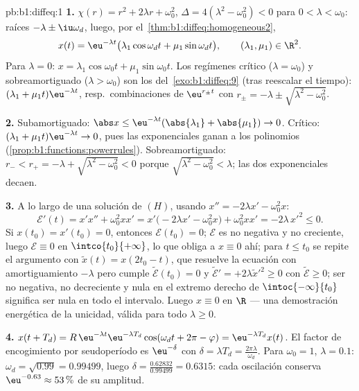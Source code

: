 \begin{solution}{pb:b1:diffeq:1}
\textbf{1.} $\chi(r) = r^2 + 2\lambda r + \omega_0^2$,
$\Delta = 4(\lambda^2 - \omega_0^2) < 0$ para $0 < \lambda < \omega_0$:
raíces $-\lambda \pm \iu\omega_d$, luego, por
el~\cref{thm:b1:diffeq:homogeneous2},
\[
x(t) = \eu^{-\lambda t}\bigl(\lambda_1\cos\omega_d t +
\mu_1\sin\omega_d t\bigr), \qquad (\lambda_1, \mu_1) \in \R^2 .
\]
Para $\lambda = 0$: $x = \lambda_1\cos\omega_0 t + \mu_1\sin\omega_0 t$.
Los regímenes crítico ($\lambda = \omega_0$) y sobreamortiguado
($\lambda > \omega_0$) son los del~\cref{exo:b1:diffeq:9} (tras
reescalar el tiempo): $(\lambda_1 + \mu_1 t)\eu^{-\lambda t}$, resp.\
combinaciones de $\eu^{r_\pm t}$ con
$r_\pm = -\lambda \pm \sqrt{\lambda^2 - \omega_0^2}$.

\textbf{2.} Subamortiguado: $\abs x \leq \eu^{-\lambda
t}(\abs{\lambda_1} + \abs{\mu_1}) \to 0$. Crítico:
$(\lambda_1 + \mu_1 t)\eu^{-\lambda t} \to 0$, pues las exponenciales
ganan a los polinomios (\cref{prop:b1:functions:powerrules}).
Sobreamortiguado: $r_- < r_+ = -\lambda + \sqrt{\lambda^2 -
\omega_0^2} < 0$ porque $\sqrt{\lambda^2 - \omega_0^2} < \lambda$; las
dos exponenciales decaen.

\textbf{3.} A lo largo de una solución de $(H)$, usando
$x'' = -2\lambda x' - \omega_0^2 x$:
\[
\mathcal E'(t) = x'x'' + \omega_0^2 x x'
= x'\bigl(-2\lambda x' - \omega_0^2 x\bigr) + \omega_0^2 xx'
= -2\lambda\,x'^2 \leq 0 .
\]
Si $x(t_0) = x'(t_0) = 0$, entonces $\mathcal E(t_0) = 0$; $\mathcal E$
es no negativa y no creciente, luego $\mathcal E \equiv 0$ en
$\intco{t_0}{+\infty}$, lo que obliga a $x \equiv 0$ ahí; para
$t \leq t_0$ se repite el argumento con $\tilde x(t) = x(2t_0 - t)$,
que resuelve la ecuación con amortiguamiento $-\lambda$ pero cumple
$\tilde{\mathcal E}(t_0) = 0$ y $\tilde{\mathcal E}' =
+2\lambda\tilde x'^2 \geq 0$ con $\tilde{\mathcal E} \geq 0$; ser no
negativa, no decreciente y nula en el extremo derecho de
$\intoc{-\infty}{t_0}$ significa ser nula en todo el intervalo. Luego
$x \equiv 0$ en $\R$ --- una demostración energética de la unicidad,
válida para todo $\lambda \geq 0$.

\textbf{4.} $x(t + T_d) = R\,\eu^{-\lambda t}\eu^{-\lambda
T_d}\cos(\omega_d t + 2\pi - \varphi) = \eu^{-\lambda T_d}x(t)$. El
factor de encogimiento por seudoperíodo es $\eu^{-\delta}$ con
$\delta = \lambda T_d = \frac{2\pi\lambda}{\omega_d}$. Para
$\omega_0 = 1$, $\lambda = 0.1$: $\omega_d = \sqrt{0.99} = 0.99499$,
luego $\delta = \frac{0.62832}{0.99499} = 0.6315$: cada oscilación
conserva $\eu^{-0.63} \approx 53\,\%$ de su amplitud.


\end{solution}
